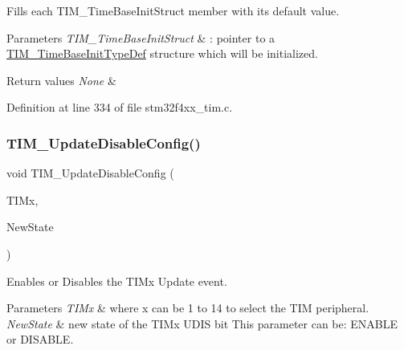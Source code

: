 Fills each T\+I\+M\+\_\+\+Time\+Base\+Init\+Struct member with its default value. 


\begin{DoxyParams}{Parameters}
{\em T\+I\+M\+\_\+\+Time\+Base\+Init\+Struct} & \+: pointer to a \hyperlink{struct_t_i_m___time_base_init_type_def}{T\+I\+M\+\_\+\+Time\+Base\+Init\+Type\+Def} structure which will be initialized. \\
\hline
\end{DoxyParams}

\begin{DoxyRetVals}{Return values}
{\em None} & \\
\hline
\end{DoxyRetVals}


Definition at line 334 of file stm32f4xx\+\_\+tim.\+c.

\mbox{\label{group___t_i_m___group1_gace2384dd33e849a054f61b8e1fc7e7c3}} 
\subsubsection{\texorpdfstring{T\+I\+M\+\_\+\+Update\+Disable\+Config()}{TIM\_UpdateDisableConfig()}}
{\footnotesize\ttfamily void T\+I\+M\+\_\+\+Update\+Disable\+Config (\begin{DoxyParamCaption}\item[{\hyperlink{struct_t_i_m___type_def}{T\+I\+M\+\_\+\+Type\+Def} $\ast$}]{T\+I\+Mx,  }\item[{Functional\+State}]{New\+State }\end{DoxyParamCaption})}



Enables or Disables the T\+I\+Mx Update event. 


\begin{DoxyParams}{Parameters}
{\em T\+I\+Mx} & where x can be 1 to 14 to select the T\+IM peripheral. \\
\hline
{\em New\+State} & new state of the T\+I\+Mx U\+D\+IS bit This parameter can be\+: E\+N\+A\+B\+LE or D\+I\+S\+A\+B\+LE. \\
\hline
\end{DoxyParams}

